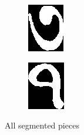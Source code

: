 \documentclass{standalone}
\begin{document}
\begin{figure}
\begin{subfigure}{0.15\textwidth}
\end{subfigure}
\begin{subfigure}{0.15\textwidth}
  \centering
  \includegraphics[width=0.8\linewidth]{./img/sample/stage13-8}
\end{subfigure}
\begin{subfigure}{0.15\textwidth}
  \centering
  \includegraphics[width=0.8\linewidth]{./img/sample/stage13-9}
\end{subfigure}
\caption{All segmented pieces}
\label{fig:SegmentedSamples}
\end{figure}
\end{document}
